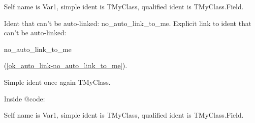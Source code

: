 \documentclass{report}
\begin{document}
\begin{list}{}
\begin{description}
 Self name is Var1, simple ident is TMyClass, qualified ident is TMyClass.Field.

Ident that can't be auto{-}linked: no{\_}auto{\_}link{\_}to{\_}me. Explicit link to ident that can't be auto{-}linked: \begin{ttfamily}no{\_}auto{\_}link{\_}to{\_}me\end{ttfamily}(\ref{ok_auto_link-no_auto_link_to_me}).

Simple ident once again TMyClass.

Inside @code:

\begin{ttfamily} Self name is Var1, simple ident is TMyClass, qualified ident is TMyClass.Field.\end{ttfamily}  
\end{description}

\end{list}
\end{document}
